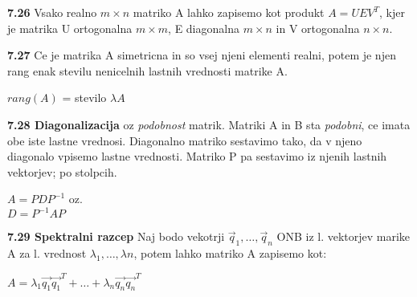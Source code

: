 \documentclass{article}
\begin{document}
\begin{multicols}{3}
\textbf{7.26} Vsako realno $m \times n$ matriko A lahko zapisemo kot produkt
$A = UEV^{T}$, kjer je matrika U ortogonalna $m \times m$, E diagonalna $m \times n$ in
V ortogonalna $n \times n$.

\textbf{7.27} Ce je  matrika A simetricna in so vsej njeni elementi realni, potem je njen rang enak stevilu nenicelnih lastnih
vrednosti matrike A.
\begin{center}
    $rang(A)$ = stevilo $\lambda A$
\end{center}

\textbf{7.28 Diagonalizacija} oz \textit{podobnost} matrik. Matriki A in B sta \textit{podobni}, ce imata
obe iste lastne vrednosi. Diagonalno matriko sestavimo tako, da v njeno diagonalo vpisemo lastne vrednosti. Matriko 
P pa sestavimo iz njenih lastnih vektorjev; po stolpcih.
\begin{center}
    \begin{math}
        A = PDP^{-1}
    \end{math} oz.\\
    \begin{math}
        D = P^{-1}AP
    \end{math}
\end{center}

\textbf{7.29 Spektralni razcep}
Naj bodo vekotrji $\vec{q}_{1}, \dots, \vec{q}_{n}$ ONB iz l. vektorjev marike A za l. vrednost $\lambda_{1}, \dots, \lambda{n}$,
potem lahko matriko A zapisemo kot:
\begin{center}
    \begin{math}
        A = \lambda_{1} \vec{q_{1}} \vec{q_{1}}^{T} + \dots + \lambda_{n} \vec{q_{n}} \vec{q_{n}}^{T}
    \end{math}
\end{center}

\end{multicols}
\end{document}
